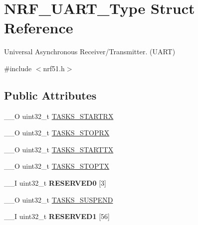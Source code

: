 \hypertarget{struct_n_r_f___u_a_r_t___type}{}\section{N\+R\+F\+\_\+\+U\+A\+R\+T\+\_\+\+Type Struct Reference}
\label{struct_n_r_f___u_a_r_t___type}


Universal Asynchronous Receiver/\+Transmitter. (U\+A\+R\+T)  




{\ttfamily \#include $<$nrf51.\+h$>$}

\subsection*{Public Attributes}
\begin{DoxyCompactItemize}
\item 
\+\_\+\+\_\+\+O uint32\+\_\+t \hyperlink{struct_n_r_f___u_a_r_t___type_ac3c706bf6982970135b90cffbb292843}{T\+A\+S\+K\+S\+\_\+\+S\+T\+A\+R\+T\+R\+X}
\item 
\+\_\+\+\_\+\+O uint32\+\_\+t \hyperlink{struct_n_r_f___u_a_r_t___type_a7610007a8cbd34ca72e961f6811a1a86}{T\+A\+S\+K\+S\+\_\+\+S\+T\+O\+P\+R\+X}
\item 
\+\_\+\+\_\+\+O uint32\+\_\+t \hyperlink{struct_n_r_f___u_a_r_t___type_a488d441dbbe1556b761f2afb3406648d}{T\+A\+S\+K\+S\+\_\+\+S\+T\+A\+R\+T\+T\+X}
\item 
\+\_\+\+\_\+\+O uint32\+\_\+t \hyperlink{struct_n_r_f___u_a_r_t___type_a0e3dbdaf5508ce376655e8418b7aa737}{T\+A\+S\+K\+S\+\_\+\+S\+T\+O\+P\+T\+X}
\item 
\hypertarget{struct_n_r_f___u_a_r_t___type_aecd83b2d37ed8dac4bfc37e95f82000d}{}\+\_\+\+\_\+\+I uint32\+\_\+t {\bfseries R\+E\+S\+E\+R\+V\+E\+D0} \mbox{[}3\mbox{]}\label{struct_n_r_f___u_a_r_t___type_aecd83b2d37ed8dac4bfc37e95f82000d}

\item 
\+\_\+\+\_\+\+O uint32\+\_\+t \hyperlink{struct_n_r_f___u_a_r_t___type_ae16d0ad0df5041d1c350cde23abdd44c}{T\+A\+S\+K\+S\+\_\+\+S\+U\+S\+P\+E\+N\+D}
\item 
\hypertarget{struct_n_r_f___u_a_r_t___type_ad65f43d13ec56ebb8b473699e55b6b8a}{}\+\_\+\+\_\+\+I uint32\+\_\+t {\bfseries R\+E\+S\+E\+R\+V\+E\+D1} \mbox{[}56\mbox{]}\label{struct_n_r_f___u_a_r_t___type_ad65f43d13ec56ebb8b473699e55b6b8a}


\end{DoxyCompactItemize}
